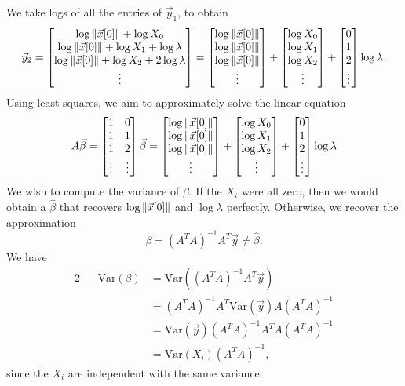 \documentclass[letterpaper]{article}
\theoremstyle{remark}
\newcommand{\Var}[1]{\mathrm{Var}({#1})}
\newcommand{\mat}[1]{\ensuremath{\begin{bmatrix}#1\end{bmatrix}}}
\newcommand{\eqn}[1]{\begin{alignat*}{2}#1\end{alignat*}}
\begin{document}
We take logs of all the entries of $\vec{y}_1$, to obtain
\[
    \vec{y}_2 = \mat{\log{\norm{\vec{x}[0]}} + \log{X_0} \\ \log{\norm{\vec{x}[0]}} + \log{X_1} + \log{\lambda} \\  \log{\norm{\vec{x}[0]}} + \log{X_2} + 2\log{\lambda} \\ \vdots} = \mat{ \log{\norm{\vec{x}[0]}} \\ \log{\norm{\vec{x}[0]}} \\ \log{\norm{\vec{x}[0]}} \\ \vdots} + \mat{\log{X_0} \\ \log{X_1} \\ \log{X_2} \\ \vdots} + \mat{0 \\ 1 \\ 2 \\ \vdots} \log{\lambda}.
\]
Using least squares, we aim to approximately solve the linear equation
\[
    A\vec{\beta} = \mat{1 & 0 \\ 1 & 1 \\ 1 & 2 \\ \vdots & \vdots} \vec{\beta} = \mat{\log{\norm{\vec{x}[0]}} \\ \log{\norm{\vec{x}[0]}} \\ \log{\norm{\vec{x}[0]}} \\ \vdots} + \mat{\log{X_0} \\ \log{X_1} \\ \log{X_2} \\ \vdots} + \mat{0 \\ 1 \\ 2 \\ \vdots} \log{\lambda}
\]
We wish to compute the variance of $\beta$. If the $X_i$ were all zero, then we would obtain a $\hat{\beta}$ that recovers $\log{\norm{\vec{x}[0]}}$ and $\log{\lambda}$ perfectly. Otherwise, we recover the approximation
\[
    \beta = (A^TA)^{-1}A^T \vec{y} \ne \hat{\beta}.
\]
We have
\eqn{
    && \Var{\beta} &= \Var{(A^TA)^{-1}A^T \vec{y}} \\
    &&&= (A^TA)^{-1}A^T \Var{\vec{y}} A(A^TA)^{-1} \\
    &&&= \Var{\vec{y}} (A^TA)^{-1}A^TA(A^TA)^{-1} \\
    &&&= \Var{X_i} (A^TA)^{-1},
}
since the $X_i$ are independent with the same variance.
\end{document}
